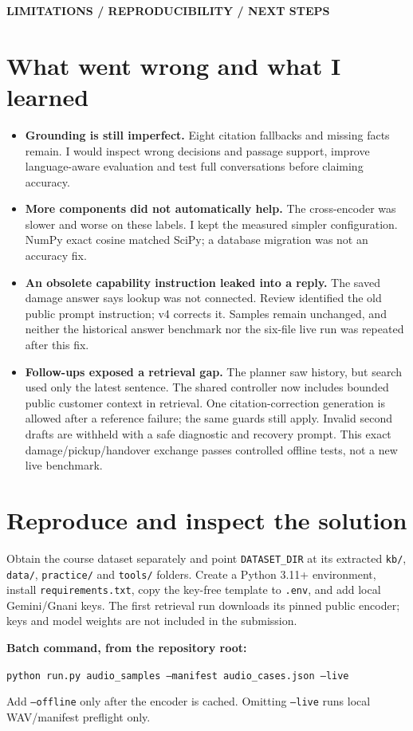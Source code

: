 \documentclass[10pt,a4paper]{article}
\newcommand{\tagline}[1]{{\small\bfseries\color{teal}#1}\par}
\newcommand{\note}[1]{\par\noindent\colorbox{mint}{\parbox{\dimexpr\linewidth-2\fboxsep}{\small #1}}\par}
\begin{document}
\newpage
\tagline{LIMITATIONS / REPRODUCIBILITY / NEXT STEPS}
\section{What went wrong and what I learned}
\begin{itemize}
\item \textbf{Grounding is still imperfect.} Eight citation fallbacks and missing
facts remain. I would inspect wrong decisions and passage support, improve
language-aware evaluation and test full conversations before claiming accuracy.
\item \textbf{More components did not automatically help.} The cross-encoder was
slower and worse on these labels. I kept the measured simpler configuration.
NumPy exact cosine matched SciPy; a database migration was not an accuracy fix.
\item \textbf{An obsolete capability instruction leaked into a reply.} The saved
damage answer says lookup was not connected. Review identified the old public
prompt instruction; v4 corrects it. Samples remain unchanged, and neither the
historical answer benchmark nor the six-file live run was repeated after this fix.
\item \textbf{Follow-ups exposed a retrieval gap.} The planner saw history, but
search used only the latest sentence. The shared controller now includes bounded
public customer context in retrieval. One citation-correction generation is
allowed after a reference failure; the same guards still apply. Invalid second
drafts are withheld with a safe diagnostic and recovery prompt. This exact
damage/pickup/handover exchange passes controlled offline tests, not a new live benchmark.
\end{itemize}

\section{Reproduce and inspect the solution}
Obtain the course dataset separately and point \texttt{DATASET\_DIR} at its
extracted \texttt{kb/}, \texttt{data/}, \texttt{practice/} and \texttt{tools/}
folders. Create a Python 3.11+ environment, install \texttt{requirements.txt}, copy
the key-free template to \texttt{.env}, and add local Gemini/Gnani keys.
The first retrieval run downloads its pinned public encoder; keys and model
weights are not included in the submission.

\note{\textbf{Batch command, from the repository root:}\par
\texttt{python run.py audio\_samples --manifest audio\_cases.json --live}\par
Add \texttt{--offline} only after the encoder is cached. Omitting \texttt{--live}
runs local WAV/manifest preflight only.}
\end{document}
